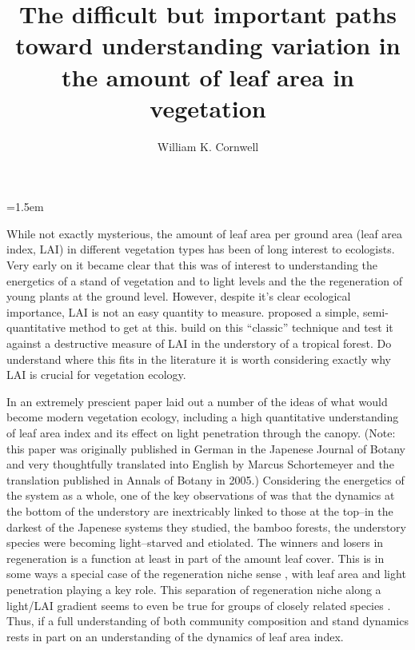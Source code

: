 \documentclass[11pt]{article}
\title{The difficult but important paths toward understanding variation in the amount of leaf area in vegetation}
\author[1]{
William K. Cornwell
}
\date{}
\affil[1] {Ecology and Evolution Research Centre, School of Biological, Earth and Environmental Sciences, University of New South Wales, Sydney, NSW 2052, Australia. Email for correspondence: \texttt{wcornwell@gmail.com}\\}
\begin{document}
	
\maketitle

\newpage	
	
	\parindent=1.5em
	\addtolength{\parskip}{.3em}
	\vfill
	
	\newpage
	
	While not exactly mysterious, the amount of leaf area per ground area (leaf area index, LAI) in different vegetation types has been of long interest to ecologists.  Very early on it became clear that this was of interest to understanding the energetics of a stand of vegetation and to light levels and the the regeneration of young plants at the ground level.  However, despite it's clear ecological importance, LAI is not an easy quantity to measure.  \citet{braun1932plant} proposed a simple, semi-quantitative method to get at this.  \cite{dobert2015can} build on this ``classic'' technique and test it against a destructive measure of LAI in the understory of a tropical forest.  Do understand where this fits in the literature it is worth considering exactly why LAI is crucial for vegetation ecology.  
	
	In an extremely prescient paper \citet{monsi1953uber} laid out a number of the ideas of what would become modern
	vegetation ecology, including a high quantitative understanding of leaf area index and its effect on light penetration through the canopy. (Note: this paper was originally published in German in the Japenese Journal of Botany and very thoughtfully translated into English by Marcus Schortemeyer and the translation published in Annals of Botany in 2005.)  Considering the energetics of the system as a whole, one of the key observations of \citet{monsi1953uber} was that the dynamics at the bottom of the understory are inextricably linked to those at the top--in the darkest of the Japenese systems they studied, the bamboo forests, the understory species were becoming light--starved and etiolated. The winners and losers in regeneration is a function at least in part of the amount leaf cover.  This is in some ways a special case of the regeneration niche sense \citet{grubb1977maintenance}, with leaf area and light penetration playing a key role\citep[see also][]{valladares2008shade}.  This separation of regeneration niche along a light/LAI gradient seems to even be true for groups of closely related species \citep[e.g. Hawaiian lobeliads, see][]{givnish2004adaptive}.  Thus, if a full understanding of both community composition and stand dynamics rests in part on an understanding of the dynamics of leaf area index.  
	
\end{document}
